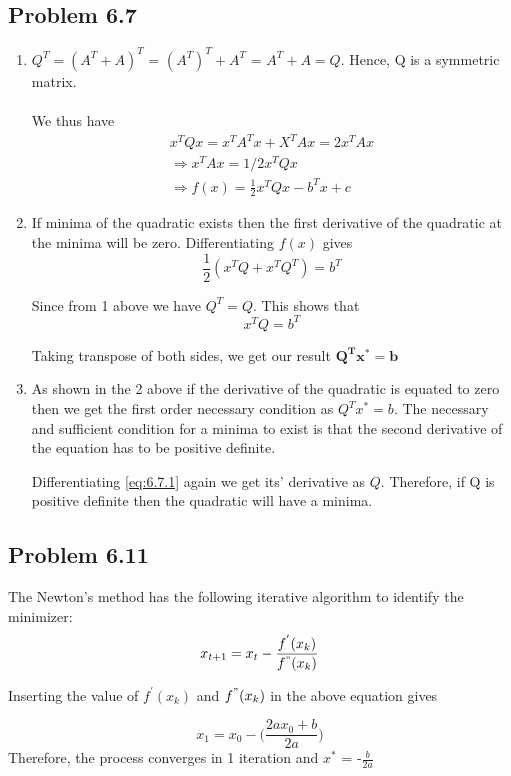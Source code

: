 \documentclass[letterpaper,12pt]{article}
\theoremstyle{definition}
\begin{document}
\subsection*{Problem 6.7}
\begin{enumerate}
    \item $Q^T =  (A^T + A)^T$ = $(A^T)^T + A^T$ = $A^T + A = Q$. Hence, Q is a symmetric matrix.\\\\
    We thus have
\begin{align*}
x^TQx = x^TA^Tx + X^TAx = 2x^TAx\\
\Rightarrow x^TAx = 1/2x^TQx\\
\Rightarrow f(x) = \frac{1}{2}x^TQx - b^Tx + c
\end{align*}    

 \item If minima of the quadratic exists then the first derivative of the quadratic at the minima will be zero. Differentiating $f(x)$ gives
 \begin{equation*}\tag{6.7.1} \label{eq:6.7.1}
\frac{1}{2}(x^TQ + x^TQ^T) = b^T
\end{equation*}    
 
 Since from 1 above we have $Q^T = Q$. This shows that 
   \begin{equation*}
x^TQ  = b^T
\end{equation*}   

Taking transpose of both sides, we get our result 
$\mathbf {Q^Tx^* = b}$
\item As shown in the 2 above if the derivative of the quadratic is equated to zero then we get the first order necessary condition as  $ Q^Tx^* = b$. The necessary and sufficient condition for a minima to exist is that the second derivative of the equation has to be positive definite.

Differentiating \eqref{eq:6.7.1} again we get its' derivative as $Q$. Therefore, if Q is positive definite then the quadratic will have a minima.

\end{enumerate}

\subsection*{Problem 6.11}

The Newton's method has the following iterative algorithm to identify the minimizer:
  \begin{equation*}
x_{t+1}  =x_{t} - \frac{f^{'}(x_k)}{f^{"}(x_k)}
\end{equation*}  
\begin{flushleft}
Inserting the value of $f^{'}(x_k)$ and $f^{"}(x_k)$ in the above equation gives
\end{flushleft}
  \begin{equation*}
x_{1}  =x_{0} - \Big(\frac{2ax_{0}+b}{2a}\Big)
\end{equation*} 
Therefore, the process converges in 1 iteration and $x^*$ =  -$\frac{b}{2a}$ 
\end{document}
